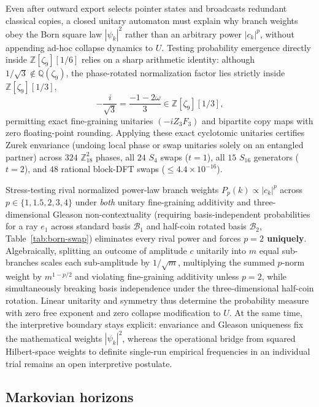 Even after outward export selects pointer states and broadcasts redundant classical copies, a closed unitary automaton
must explain why branch weights obey the Born square law $|\psi_k|^2$ rather than an arbitrary power $|c_k|^p$, without
appending ad-hoc collapse dynamics to $U$. Testing probability emergence directly inside $\mathbb{Z}[\zeta_9][1/6]$
relies on a sharp arithmetic identity: although $1/\sqrt{3} \notin \mathbb{Q}(\zeta_9)$, the phase-rotated normalization
factor lies strictly inside $\mathbb{Z}[\zeta_9][1/3]$,
\begin{equation}
-\frac{i}{\sqrt{3}} = \frac{-1 - 2\omega}{3} \in \mathbb{Z}[\zeta_9][1/3],
\label{eq:cyclotomic-sqrt3}
\end{equation}
permitting exact fine-graining unitaries $(-i Z_3 F_3)$ and bipartite copy maps with zero floating-point rounding.
Applying these exact cyclotomic unitaries certifies Zurek envariance \cite{zurek2005} (undoing local phase or swap
unitaries solely on an entangled partner) across $324$ $\mathbb{Z}_{18}^2$ phases, all $24$ $S_4$ swaps ($t = 1$), all
$15$ $S_{16}$ generators ($t = 2$), and $48$ rational block-DFT swaps ($\le 4.4 \times 10^{-16}$).

Stress-testing rival normalized power-law branch weights $P_p(k) \propto |c_k|^p$ across $p \in \{1, 1.5, 2, 3, 4\}$
under \emph{both} unitary fine-graining additivity and three-dimensional Gleason non-contextuality \cite{gleason1957}
(requiring basis-independent probabilities for a ray $e_1$ across standard basis $\mathcal{B}_1$ and half-coin rotated
basis $\mathcal{B}_2$, Table~\ref{tab:born-swap}) eliminates every rival power and forces \textbf{$p = 2$ uniquely}.
Algebraically, splitting an outcome of amplitude $c$ unitarily into $m$ equal sub-branches scales each sub-amplitude by
$1/\sqrt{m}$, multiplying the summed $p$-norm weight by $m^{1 - p/2}$ and violating fine-graining additivity unless
$p = 2$, while simultaneously breaking basis independence under the three-dimensional half-coin rotation. Linear
unitarity and symmetry thus determine the probability measure with zero free exponent and zero collapse modification to
$U$. At the same time, the interpretive boundary stays explicit: envariance and Gleason uniqueness fix the mathematical
weights $|\psi_k|^2$, whereas the operational bridge from squared Hilbert-space weights to definite single-run empirical
frequencies in an individual trial remains an open interpretive postulate.

\subsection{Markovian horizons}

